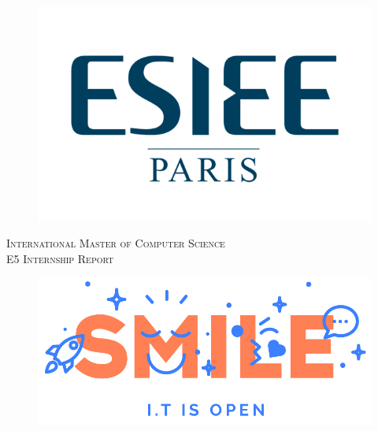 \documentclass[12pt,a4paper,oneside]{article}
\begin{document}

\begin{titlepage} %
	\newcommand{\HRule}{\rule{\linewidth}{0.5mm}} %

	\center %

	\begin{figure}[H]
	\centering
	  \includegraphics[scale=1.8]{img/logo_esiee.png}
	  \label{fig:logo_esiee}
	\end{figure}

	\textsc{\Large International Master of Computer Science}\\[0.5cm] %

	\textsc{\Large E5 Internship Report}\\[0.4cm] %

	\vspace*{30px}

	\begin{figure}[H]
	\centering
	  \includegraphics[scale=0.3]{img/smile.png}
	  \label{fig:logo_smile}
	\end{figure}


\end{titlepage}
\end{document}
